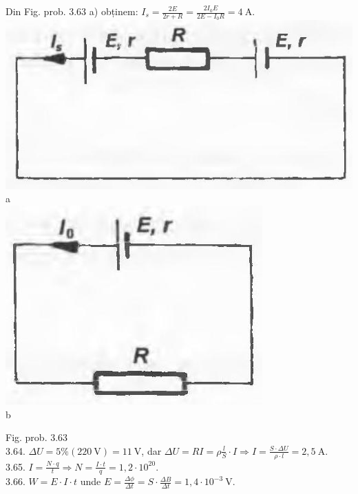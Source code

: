 \documentclass[10pt]{article}
\begin{document}
Din Fig. prob. 3.63 a) obținem: $I_{s}=\frac{2 E}{2 r+R}=\frac{2 I_{0} E}{2 E-I_{0} R}=4 \mathrm{~A}$.\\
\includegraphics[max width=\textwidth, center]{2025_07_01_5b3ff9fa0d508c8e9f17g-353(1)}\\
a\\
\includegraphics[max width=\textwidth, center]{2025_07_01_5b3ff9fa0d508c8e9f17g-353}\\
b

Fig. prob. 3.63\\
3.64. $\Delta U=5 \%(220 \mathrm{~V})=11 \mathrm{~V}$, dar $\Delta U=R I=\rho \frac{l}{S} \cdot I \Rightarrow I=\frac{S \cdot \Delta U}{\rho \cdot l}=2,5 \mathrm{~A}$.\\
3.65. $I=\frac{N \cdot q}{t} \Rightarrow N=\frac{I \cdot t}{q}=1,2 \cdot 10^{20}$.\\
3.66. $W=E \cdot I \cdot t$ unde $E=\frac{\Delta \phi}{\Delta t}=S \cdot \frac{\Delta B}{\Delta t}=1,4 \cdot 10^{-3} \mathrm{~V}$.
\end{document}
